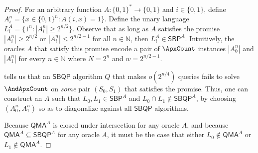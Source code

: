 \begin{proof}
For an arbitrary function $A: \{0,1\}^* \to \{0,1\}$ and $i \in \{0,1\}$, define $A_i^n = \{x \in \{0,1\}^n : A(i, x) = 1\}$. Define the unary language $L^A_i = \{1^n : |A_i^n| \ge 2^{n/2}\}$. Observe that as long as $A$ satisfies the promise $|A_i^n| \ge 2^{n/2}$ or $|A_i^n| \le 2^{n/2-1}$ for all $n \in \mathbb{N}$, then $L^A_i \in \mathsf{SBP}^A$. Intuitively, the oracles $A$ that satisfy this promise encode a pair of $\ApxCount$ instances $|A_0^n|$ and $|A_1^n|$ for every $n \in \mathbb{N}$ where $N = 2^n$ and $w = 2^{n/2 - 1}$.

 tells us that an $\mathsf{SBQP}$ algorithm $Q$ that makes $o(2^{n/4})$ queries fails to solve $\AndApxCount$ on \textit{some} pair $(S_0, S_1)$ that satisfies the promise. Thus, one can construct an $A$ such that $L_0, L_1 \in \mathsf{SBP}^A$ and $L_0 \cap L_1 \not\in \mathsf{SBQP}^A$, by choosing $(A_0^n, A_1^n)$ so as to diagonalize against all $\mathsf{SBQP}$ algorithms.

Because $\mathsf{QMA}^A$ is closed under intersection for any oracle $A$, and because $\mathsf{QMA}^A \subseteq \mathsf{SBQP}^A$ for any oracle $A$, it must be the case that either $L_0 \not\in \mathsf{QMA}^A$ or $L_1 \not\in \mathsf{QMA}^A$.
\end{proof}

%
%
%


%

